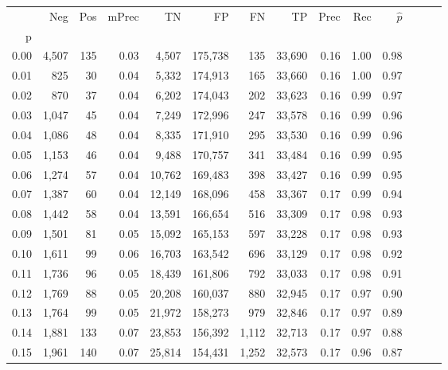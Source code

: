 \begin{tabular}{rrrrrrrrrrrrrr}
\toprule
{} &    Neg &  Pos & mPrec &       TN &       FP &      FN &      TP &  Prec &   Rec & $\hat{p}$ \\
p    &        &      &       &          &          &         &         &       &       &           \\
\midrule
0.00 &  4,507 &  135 &  0.03 &    4,507 &  175,738 &     135 &  33,690 &  0.16 &  1.00 &      0.98 \\
0.01 &    825 &   30 &  0.04 &    5,332 &  174,913 &     165 &  33,660 &  0.16 &  1.00 &      0.97 \\
0.02 &    870 &   37 &  0.04 &    6,202 &  174,043 &     202 &  33,623 &  0.16 &  0.99 &      0.97 \\
0.03 &  1,047 &   45 &  0.04 &    7,249 &  172,996 &     247 &  33,578 &  0.16 &  0.99 &      0.96 \\
0.04 &  1,086 &   48 &  0.04 &    8,335 &  171,910 &     295 &  33,530 &  0.16 &  0.99 &      0.96 \\
0.05 &  1,153 &   46 &  0.04 &    9,488 &  170,757 &     341 &  33,484 &  0.16 &  0.99 &      0.95 \\
0.06 &  1,274 &   57 &  0.04 &   10,762 &  169,483 &     398 &  33,427 &  0.16 &  0.99 &      0.95 \\
0.07 &  1,387 &   60 &  0.04 &   12,149 &  168,096 &     458 &  33,367 &  0.17 &  0.99 &      0.94 \\
0.08 &  1,442 &   58 &  0.04 &   13,591 &  166,654 &     516 &  33,309 &  0.17 &  0.98 &      0.93 \\
0.09 &  1,501 &   81 &  0.05 &   15,092 &  165,153 &     597 &  33,228 &  0.17 &  0.98 &      0.93 \\
0.10 &  1,611 &   99 &  0.06 &   16,703 &  163,542 &     696 &  33,129 &  0.17 &  0.98 &      0.92 \\
0.11 &  1,736 &   96 &  0.05 &   18,439 &  161,806 &     792 &  33,033 &  0.17 &  0.98 &      0.91 \\
0.12 &  1,769 &   88 &  0.05 &   20,208 &  160,037 &     880 &  32,945 &  0.17 &  0.97 &      0.90 \\
0.13 &  1,764 &   99 &  0.05 &   21,972 &  158,273 &     979 &  32,846 &  0.17 &  0.97 &      0.89 \\
0.14 &  1,881 &  133 &  0.07 &   23,853 &  156,392 &   1,112 &  32,713 &  0.17 &  0.97 &      0.88 \\
0.15 &  1,961 &  140 &  0.07 &   25,814 &  154,431 &   1,252 &  32,573 &  0.17 &  0.96 &      0.87 \\

\end{tabular}
